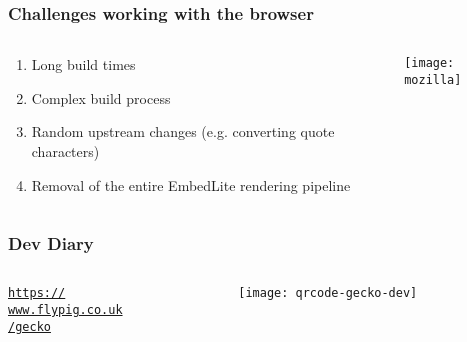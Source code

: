 \documentclass[
	notes=none,
	aspectratio=169
]{beamer}
\begin{document}
\begin{frame}
\frametitle{Challenges working with the browser}

\begin{columns}[T]
\begin{column}[T]{0.5\textwidth}
\setlength{\parskip}{0.5em}

\vspace{1.5cm}
\begin{enumerate}
\setlength{\parskip}{0.5em}
\item Long build times
\item Complex build process
\item Random upstream changes (e.g. converting quote characters)
\item Removal of the entire EmbedLite rendering pipeline
\end{enumerate}

\end{column}
\begin{column}[T]{0.5\textwidth}
\setlength{\parskip}{0.5em}

\vspace{0.5cm}
\texttt{[image: mozilla]}

\end{column}
\end{columns}

\end{frame}
\note{
\begin{enumerate}
\item -
\end{enumerate}
}


\begin{frame}
\frametitle{Dev Diary}

\begin{columns}[T]
\begin{column}[T]{0.6\textwidth}
\setlength{\parskip}{0.5em}

\vspace{1.2cm}
{\huge
\href{https://www.flypig.co.uk/gecko}{{\tt https:// \\
www.flypig.co.uk \\
/gecko\\
}
}}

\end{column}
\begin{column}[T]{0.3\textwidth}
\setlength{\parskip}{0.5em}

\vspace{0.5cm}
\texttt{[image: qrcode-gecko-dev]}

\end{column}
\end{columns}

\end{frame}
\note{
}
\end{document}
